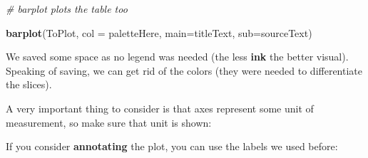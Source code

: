 \documentclass[]{article}
\newenvironment{Shaded}{\begin{snugshade}}{\end{snugshade}}
\newcommand{\KeywordTok}[1]{\textcolor[rgb]{0.13,0.29,0.53}{\textbf{#1}}}
\newcommand{\DataTypeTok}[1]{\textcolor[rgb]{0.13,0.29,0.53}{#1}}
\newcommand{\DecValTok}[1]{\textcolor[rgb]{0.00,0.00,0.81}{#1}}
\newcommand{\FloatTok}[1]{\textcolor[rgb]{0.00,0.00,0.81}{#1}}
\newcommand{\StringTok}[1]{\textcolor[rgb]{0.31,0.60,0.02}{#1}}
\newcommand{\CommentTok}[1]{\textcolor[rgb]{0.56,0.35,0.01}{\textit{#1}}}
\newcommand{\OtherTok}[1]{\textcolor[rgb]{0.56,0.35,0.01}{#1}}
\newcommand{\NormalTok}[1]{#1}
\begin{document}
\begin{Shaded}
\begin{Highlighting}[]
\CommentTok{# barplot plots the table too}

\KeywordTok{barplot}\NormalTok{(ToPlot,}
         \DataTypeTok{col =}\NormalTok{ paletteHere,}
         \DataTypeTok{main=}\NormalTok{titleText,}
         \DataTypeTok{sub=}\NormalTok{sourceText)}
\end{Highlighting}
\end{Shaded}

We saved some space as no legend was needed (the less \textbf{ink} the
better visual). Speaking of saving, we can get rid of the colors (they
were needed to differentiate the slices).

A very important thing to consider is that axes represent some unit of
measurement, so make sure that unit is shown:

\begin{Shaded}
\end{Shaded}

If you consider \textbf{annotating} the plot, you can use the labels we
used before:

\begin{Shaded}
\end{Shaded}
\end{document}
